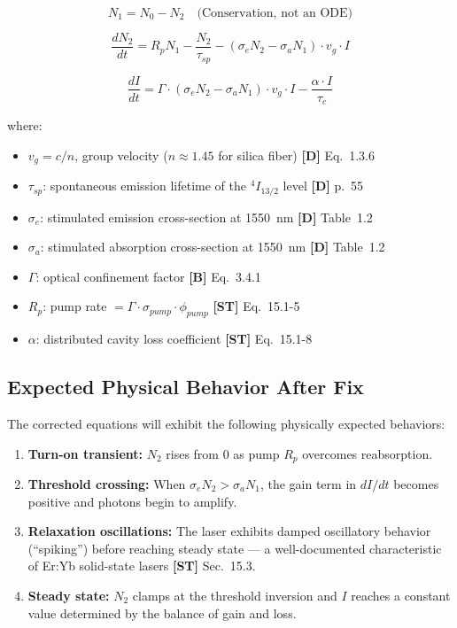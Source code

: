 \documentclass[12pt,a4paper]{article}
\begin{document}
\begin{equation}
\boxed{N_1 = N_0 - N_2} \quad \text{(Conservation, not an ODE)}
\end{equation}

\begin{equation}
\frac{dN_2}{dt} = R_p N_1 - \frac{N_2}{\tau_{sp}} - (\sigma_e N_2 - \sigma_a N_1) \cdot v_g \cdot I
\label{eq:fix_n2}
\end{equation}

\begin{equation}
\frac{dI}{dt} = \Gamma \cdot (\sigma_e N_2 - \sigma_a N_1) \cdot v_g \cdot I - \frac{\alpha \cdot I}{\tau_c}
\label{eq:fix_I}
\end{equation}

where:
\begin{itemize}
    \item $v_g = c/n$, group velocity ($n \approx 1.45$ for silica fiber) \hfill \textbf{[D]} Eq.~1.3.6
    \item $\tau_{sp}$: spontaneous emission lifetime of the $^4I_{13/2}$ level \hfill \textbf{[D]} p.~55
    \item $\sigma_e$: stimulated emission cross-section at 1550~nm \hfill \textbf{[D]} Table~1.2
    \item $\sigma_a$: stimulated absorption cross-section at 1550~nm \hfill \textbf{[D]} Table~1.2
    \item $\Gamma$: optical confinement factor \hfill \textbf{[B]} Eq.~3.4.1
    \item $R_p$: pump rate $= \Gamma \cdot \sigma_{pump} \cdot \phi_{pump}$ \hfill \textbf{[ST]} Eq.~15.1-5
    \item $\alpha$: distributed cavity loss coefficient \hfill \textbf{[ST]} Eq.~15.1-8
\end{itemize}

\subsection{Expected Physical Behavior After Fix}

The corrected equations will exhibit the following physically expected behaviors:

\begin{enumerate}
    \item \textbf{Turn-on transient:} $N_2$ rises from 0 as pump $R_p$ overcomes reabsorption.
    \item \textbf{Threshold crossing:} When $\sigma_e N_2 > \sigma_a N_1$, the gain term in $dI/dt$ becomes positive and photons begin to amplify.
    \item \textbf{Relaxation oscillations:} The laser exhibits damped oscillatory behavior (``spiking'') before reaching steady state --- a well-documented characteristic of Er:Yb solid-state lasers \textbf{[ST]} Sec.~15.3.
    \item \textbf{Steady state:} $N_2$ clamps at the threshold inversion and $I$ reaches a constant value determined by the balance of gain and loss.
\end{enumerate}
\end{document}
